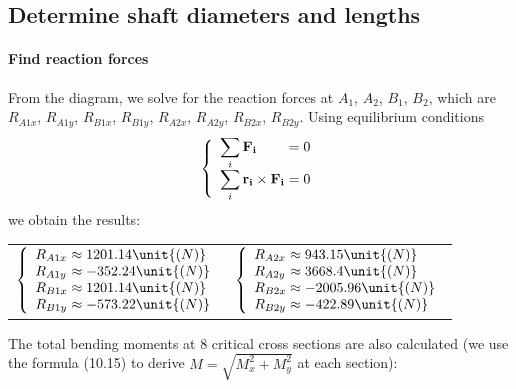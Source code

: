 \subsection{Determine shaft diameters and lengths}

\paragraph{Find reaction forces}


From the diagram, we solve for the reaction forces at $ A_1 $, $ A_2 $, $ B_1 $, $ B_2 $, which are $ R_{A1x} $, $ R_{A1y} $, $ R_{B1x} $, $ R_{B1y} $, $ R_{A2x} $, $ R_{A2y} $, $ R_{B2x} $, $ R_{B2y} $. Using equilibrium conditions
\[
\left\{ 
\begin{array}{l@{{}={}}l}
\displaystyle\sum_{i} \mathbf{F_{i}} & 0\\
\displaystyle\sum_{i} \mathbf{r_i}\times \mathbf{F_i}& 0\\
\end{array}
\right.
\]
we obtain the results:\vskip2mm
{\centering
	\begin{tabular}[ht]{p{7cm}p{7cm}}
		$
		\left\{ 
		\begin{array}{l@{{} \approx {}}l}
		R_{A1x} & 1201.14\unit{(N)}\\
		R_{A1y} & -352.24\unit{(N)}\\
		R_{B1x} & 1201.14\unit{(N)}\\
		R_{B1y} & -573.22\unit{(N)}\\
		\end{array}
		\right.
		$ & $
		\left\{ 
		\begin{array}{l@{{} \approx {}}l}
		R_{A2x} & 943.15\unit{(N)}\\
		R_{A2y} & 3668.4 \unit{(N)}\\
		R_{B2x} & -2005.96 \unit{(N)}\\
		R_{B2y} & -422.89 \unit{(N)}\\
		\end{array}
		\right.
		$
\end{tabular}}\vskip2mm
The total bending moments at 8 critical cross sections are also calculated (we use the formula (10.15) to derive $M=\sqrt{M_x^2+M_y^2}$ at each section):\vskip2mm
